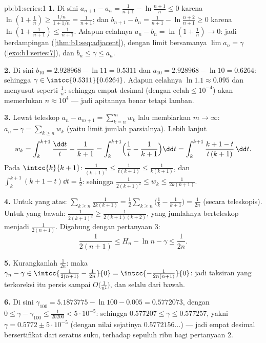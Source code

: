 \begin{solution}{pb:b1:series:1}
\textbf{1.} Di sini $a_{n+1} - a_n = \frac{1}{n+1} - \ln\frac{n+1}{n}
\leq 0$ karena $\ln(1 + \frac1n) \geq \frac{1/n}{1 + 1/n} =
\frac{1}{n+1}$; dan $b_{n+1} - b_n = \frac{1}{n+1} -
\ln\frac{n+2}{n+1} \geq 0$ karena $\ln(1 + \frac{1}{n+1}) \leq
\frac{1}{n+1}$. Adapun celahnya $a_n - b_n = \ln(1 + \frac1n) \to 0$:
jadi berdampingan (\cref{thm:b1:seq:adjacent}), dengan limit bersamanya $\lim
a_n = \gamma$ (\cref{exo:b1:series:7}), dan $b_n \leq \gamma
\leq a_n$.

\textbf{2.} Di sini $b_{10} = 2.928968 - \ln 11 = 0.5311$ dan $a_{10} =
2.928968 - \ln 10 = 0.6264$: sehingga $\gamma \in
\intcc{0.5311}{0.6264}$. Adapun celahnya $\ln 1.1 \approx 0.095$ dan
menyusut seperti $\frac1n$: sehingga empat desimal (dengan $\text{celah} \leq
10^{-4}$) akan memerlukan $n \approx 10^4$ --- jadi apitannya
benar tetapi lamban.

\textbf{3.} Lewat teleskop $a_n - a_{m+1} = \sum_{k=n}^{m} w_k$ lalu
membiarkan $m \to \infty$: $a_n - \gamma = \sum_{k\geq n} w_k$
(yaitu limit jumlah parsialnya). Lebih lanjut
\[
w_k = \int_k^{k+1} \frac{\dd t}{t} - \frac{1}{k+1}
= \int_k^{k+1} \Bigl(\frac1t - \frac{1}{k+1}\Bigr)\dd t
= \int_k^{k+1} \frac{k + 1 - t}{t\,(k+1)}\,\dd t .
\]
Pada $\intcc{k}{k+1}$: $\frac{1}{(k+1)^2} \leq \frac{1}{t(k+1)}
\leq \frac{1}{k(k+1)}$, dan $\int_k^{k+1}(k + 1 - t)\dd t =
\frac12$: sehingga $\frac{1}{2(k+1)^2} \leq w_k \leq
\frac{1}{2k(k+1)}$.

\textbf{4.} Untuk yang atas: $\sum_{k \geq n} \frac{1}{2k(k+1)} =
\frac12\sum_{k\geq n}\bigl(\frac1k - \frac{1}{k+1}\bigr) =
\frac{1}{2n}$ (secara teleskopis). Untuk yang bawah: $\frac{1}{2(k+1)^2} \geq
\frac{1}{2(k+1)(k+2)}$, yang jumlahnya berteleskop menjadi
$\frac{1}{2(n+1)}$. Digabung dengan pertanyaan 3:
\[
\frac{1}{2(n+1)} \leq H_n - \ln n - \gamma \leq \frac{1}{2n} .
\]

\textbf{5.} Kurangkanlah $\frac{1}{2n}$: maka $\gamma_n - \gamma \in
\intcc{\frac{1}{2(n+1)} - \frac{1}{2n}}{0} =
\intcc{-\frac{1}{2n(n+1)}}{0}$: jadi taksiran yang terkoreksi itu persis
sampai $O\bigl(\frac{1}{n^2}\bigr)$, dan selalu dari bawah.

\textbf{6.} Di sini $\gamma_{100} = 5.1873775 - \ln 100 - 0.005 =
0.5772073$, dengan $0 \leq \gamma - \gamma_{100} \leq
\frac{1}{20200} < 5\cdot10^{-5}$: sehingga $0.577207 \leq \gamma
\leq 0.577257$, yakni $\gamma = 0.5772 \pm 5\cdot10^{-5}$ (dengan nilai
sejatinya $0.5772156\dots$) --- jadi empat desimal bersertifikat dari
seratus suku, terhadap sepuluh ribu bagi pertanyaan 2.


\end{solution}
